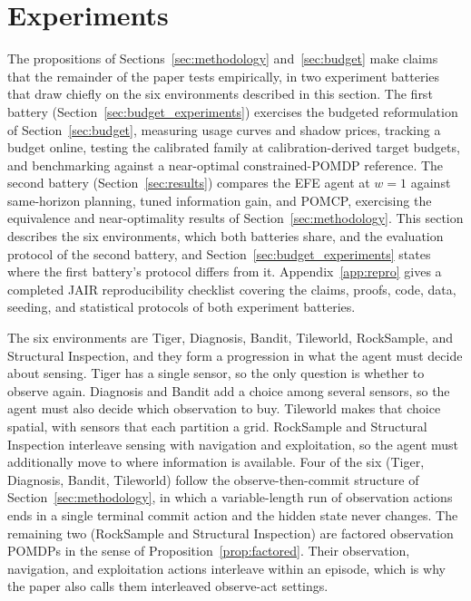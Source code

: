 \section{Experiments}
\label{sec:experiments}

The propositions of Sections~\ref{sec:methodology} and~\ref{sec:budget} make claims that the remainder of the paper tests empirically, in two experiment batteries that draw chiefly on the six environments described in this section. The first battery (Section~\ref{sec:budget_experiments}) exercises the budgeted reformulation of Section~\ref{sec:budget}, measuring usage curves and shadow prices, tracking a budget online, testing the calibrated family at calibration-derived target budgets, and benchmarking against a near-optimal constrained-POMDP reference. The second battery (Section~\ref{sec:results}) compares the EFE agent at $w{=}1$ against same-horizon planning, tuned information gain, and POMCP, exercising the equivalence and near-optimality results of Section~\ref{sec:methodology}. This section describes the six environments, which both batteries share, and the evaluation protocol of the second battery, and Section~\ref{sec:budget_experiments} states where the first battery's protocol differs from it. Appendix~\ref{app:repro} gives a completed JAIR reproducibility checklist covering the claims, proofs, code, data, seeding, and statistical protocols of both experiment batteries.

The six environments are Tiger, Diagnosis, Bandit, Tileworld, RockSample, and Structural Inspection, and they form a progression in what the agent must decide about sensing. Tiger has a single sensor, so the only question is whether to observe again. Diagnosis and Bandit add a choice among several sensors, so the agent must also decide which observation to buy. Tileworld makes that choice spatial, with sensors that each partition a grid. RockSample and Structural Inspection interleave sensing with navigation and exploitation, so the agent must additionally move to where information is available. Four of the six (Tiger, Diagnosis, Bandit, Tileworld) follow the observe-then-commit structure of Section~\ref{sec:methodology}, in which a variable-length run of observation actions ends in a single terminal commit action and the hidden state never changes. The remaining two (RockSample and Structural Inspection) are factored observation POMDPs in the sense of Proposition~\ref{prop:factored}. Their observation, navigation, and exploitation actions interleave within an episode, which is why the paper also calls them interleaved observe-act settings.

